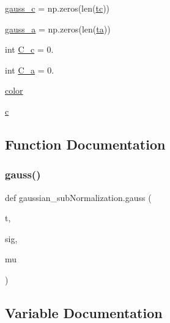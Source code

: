\begin{DoxyCompactItemize}
\hyperlink{namespacegaussian__subNormalization_a5ba46c757461de158cf012e81fa12b2b}{gauss\+\_\+c} = np.\+zeros(len(\hyperlink{namespacegaussian__subNormalization_afa6e9c91930942dec10f060f861db968}{tc}))
\item 
\hyperlink{namespacegaussian__subNormalization_a123c5bb293470cf2f2feee67d6bf2e9d}{gauss\+\_\+a} = np.\+zeros(len(\hyperlink{namespacegaussian__subNormalization_a6678635cf14e1f6b9315c0ffc30a72e2}{ta}))
\item 
int \hyperlink{namespacegaussian__subNormalization_aa761485e0e5eb068184d62a5768451a1}{C\+\_\+c} = 0.
\item 
int \hyperlink{namespacegaussian__subNormalization_a8dc5a06aa5600f9686088dfc0ab90f59}{C\+\_\+a} = 0.
\item 
\hyperlink{namespacegaussian__subNormalization_acb6b51085c2c1529ad90570c8f70cb50}{color}
\item 
\hyperlink{namespacegaussian__subNormalization_af0f46417a2e0ca88e04e8ba0cd5aec53}{c}
\end{DoxyCompactItemize}


\subsection{Function Documentation}
\mbox{\label{namespacegaussian__subNormalization_a9fdfba6c3add14aed634ae6cf69a4091}} 
\subsubsection{\texorpdfstring{gauss()}{gauss()}}
{\footnotesize\ttfamily def gaussian\+\_\+sub\+Normalization.\+gauss (\begin{DoxyParamCaption}\item[{}]{t,  }\item[{}]{sig,  }\item[{}]{mu }\end{DoxyParamCaption})}



\subsection{Variable Documentation}
\mbox{\label{namespacegaussian__subNormalization_af0f46417a2e0ca88e04e8ba0cd5aec53}} 

